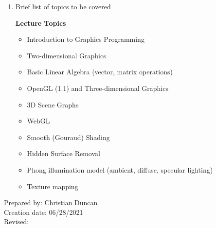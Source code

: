 \begin{enumerate}[1.]
\item Brief list of topics to be covered\\
  {\bfseries
    Lecture Topics
    \begin{itemize}
    \item Introduction to Graphics Programming
    \item Two-dimensional Graphics
    \item Basic Linear Algebra (vector, matrix operations)
    \item OpenGL (1.1) and Three-dimensional Graphics
    \item 3D Scene Graphs
    \item WebGL
    \item Smooth (Gouraud) Shading
    \item Hidden Surface Removal
    \item Phong illumination model (ambient, diffuse, specular lighting)
    \item Texture mapping
    \end{itemize}
  }
\end{enumerate}

\noindent Prepared by: Christian Duncan\\
\noindent Creation date: 06/28/2021\\
\noindent Revised:\\
